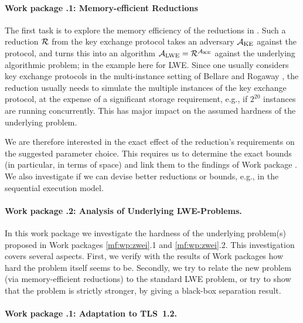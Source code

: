 \label{mf:wp:eins}

\paragraph{Work package \theworkpackage.1: Memory-efficient Reductions}

The first task is to explore the memory efficiency of the reductions in \cite{P14,BCNS15,ADPS16,BCDMNNRS16}. Such a reduction $\mathcal{R}$ from the key exchange protocol takes an adversary $\mathcal{A}_\text{KE}$ against the protocol, and turns this into an algorithm $\mathcal{A}_\text{LWE}=\mathcal{R}^{\mathcal{A}_\text{KE}}$ against the underlying algorithmic problem; in the example here for LWE.
Since one usually considers key exchange protocols in the multi-instance setting of Bellare and Rogaway \cite{BR93}, the reduction usually needs to simulate the multiple instances of the key exchange protocol, at the expense of a significant storage requirement, e.g., if $2^{20}$ instances are running concurrently. This has major impact on the assumed hardness of the underlying problem.

We are therefore interested in the exact effect of the reduction's requirements on the suggested parameter choice. This requires us to determine the exact bounds (in particular, in terms of space) and link them to the findings of Work package . 
We also investigate if we can devise better reductions or bounds, e.g., in the sequential execution model.


\paragraph{Work package \theworkpackage.2: Analysis of Underlying LWE-Problems.}

In this work package we investigate the hardness of the underlying problem(s) proposed in Work packages {\ref{mf:wp:zwei}}.1 and \ref{mf:wp:zwei}.2. This investigation covers several aspects. First, we verify with the results of Work packages  how hard the problem itself seems to be. Secondly, we try to relate the new problem (via memory-efficient reductions) to the standard LWE problem, or try to show that the problem is strictly stronger, by giving a black-box separation result.

\label{mf:wp:zwei}

\paragraph{Work package \theworkpackage.1: Adaptation to TLS~1.2.}


